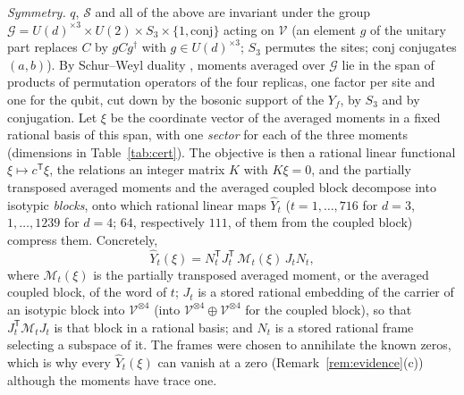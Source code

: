 \documentclass[aps,pra,twocolumn,superscriptaddress,nofootinbib,longbibliography]{revtex4-2}
\newcommand{\V}{\mathcal V}
\newcommand{\T}{\mathsf T}
\newcommand{\Yh}{\widehat Y}
\theoremstyle{plain}
\theoremstyle{definition}
\theoremstyle{remark}
\begin{document}
\emph{Symmetry.} $q$, $\mathcal S$ and all of the above are invariant under the group $\mathcal G=U(d)^{\times3}\times U(2)\times S_3\times\{1,\text{conj}\}$ acting on $\V$ (an element $g$ of the unitary part replaces $C$ by $gCg^\dagger$ with $g\in U(d)^{\times3}$; $S_3$ permutes the sites; conj conjugates $(a,b)$). By Schur--Weyl duality \cite[Lect.~6]{FultonHarris}, moments averaged over $\mathcal G$ lie in the span of products of permutation operators of the four replicas, one factor per site and one for the qubit, cut down by the bosonic support of the $Y_f$, by $S_3$ and by conjugation. Let $\xi$ be the coordinate vector of the averaged moments in a fixed rational basis of this span, with one \emph{sector} for each of the three moments (dimensions in Table~\ref{tab:cert}). The objective is then a rational linear functional $\xi\mapsto c^{\T}\xi$, the relations an integer matrix $K$ with $K\xi=0$, and the partially transposed averaged moments and the averaged coupled block decompose into isotypic \emph{blocks}, onto which rational linear maps $\Yh_t$ ($t=1,\dots,716$ for $d=3$, $1,\dots,1239$ for $d=4$; $64$, respectively $111$, of them from the coupled block) compress them. Concretely,
\begin{equation}\label{eq:Yhat}
\Yh_t(\xi)=N_t^{\T}J_t^{\T}\,\mathcal M_t(\xi)\,J_tN_t ,
\end{equation}
where $\mathcal M_t(\xi)$ is the partially transposed averaged moment, or the averaged coupled block, of the word of $t$; $J_t$ is a stored rational embedding of the carrier of an isotypic block into $\V^{\otimes4}$ (into $\V^{\otimes4}\oplus\V^{\otimes4}$ for the coupled block), so that $J_t^{\T}\mathcal M_tJ_t$ is that block in a rational basis; and $N_t$ is a stored rational frame selecting a subspace of it. The frames were chosen to annihilate the known zeros, which is why every $\Yh_t(\xi)$ can vanish at a zero (Remark~\ref{rem:evidence}(c)) although the moments have trace one.
\end{document}
